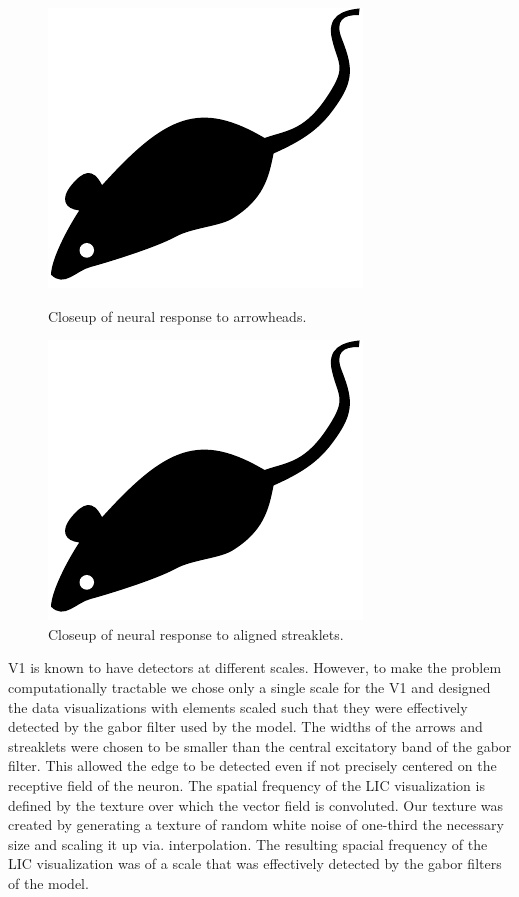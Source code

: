\documentclass[prodmode,acmtap]{acmlarge}
\begin{document}
\begin{figure}[tp]
    \begin{minipage}[t]{0.45\linewidth}
        \centering
        \includegraphics{acmlarge-mouse}
        \caption{Closeup of neural response to arrowheads.}
        \label{ortharrowheadfig}
    \end{minipage}
    \hspace{0.1\linewidth}
    \begin{minipage}[t]{0.45\linewidth}
        \centering
        \includegraphics{acmlarge-mouse}
        \caption{Closeup of neural response to aligned streaklets.}
        \label{alignedcloseupfig}
    \end{minipage}
\end{figure}


V1 is known to have detectors at different scales. However, to make
the problem computationally tractable we chose only a single scale
for the V1 and designed the data visualizations with elements scaled
such that they were effectively detected by the gabor filter used by
the model. The widths of the arrows and streaklets were chosen to be
smaller than the central excitatory band of the gabor filter. This
allowed the edge to be detected even if not precisely centered on the
receptive field of the neuron. The spatial frequency of the LIC
visualization is defined by the texture over which the vector field
is convoluted. Our texture was created by generating a texture of
random white noise of one-third the necessary size and scaling it up
via. interpolation. The resulting spacial frequency of the LIC
visualization was of a scale that was effectively detected by the
gabor filters of the model.
\end{document}

